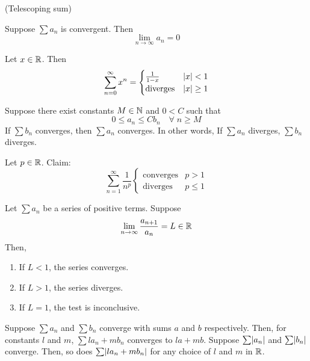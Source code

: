 \documentclass[12pt]{article}
\begin{document}
\begin{rem}
    (Telescoping sum)
\end{rem}

\begin{thm} \label{thm:divergence test}
    Suppose $\sum a_{n}$ is convergent. Then \[
        \lim_{n \to \infty} a_{n} = 0
    \]
\end{thm}

\begin{example}
    Let $x \in \mathbb{R}$. Then \[
        \sum_{n=0}^{\infty} x^{n} = \begin{cases}
            \frac{1}{1-x} & \abs{ x} < 1 \\
            \text{diverges} & \abs{ x} \geq 1
        \end{cases}
    \]
\end{example}

\begin{thm} \label{thm:comparison}
    Suppose there exist constants $M \in \mathbb{N}$ and $0 < C$ such that \[
        0 \leq a_{n} \leq C b_{n} \quad\forall\; n \geq M
    \] If $\sum b_{n}$ converges, then $\sum a_{n}$ converges. In other words, If $\sum a_{n}$ diverges, $\sum b_{n}$ diverges.
\end{thm}

\begin{example}
    Let $p \in \mathbb{R}$. Claim: \[
        \sum_{n=1}^{\infty} \frac{1}{n^{p}}
        \begin{cases}
            \text{converges} & p > 1 \\
            \text{diverges} & p \leq 1
        \end{cases}
    \]
\end{example}

\begin{thm} \label{thm:ratio test}
    Let $\sum a_{n}$ be a series of positive terms. Suppose \[
        \lim_{n \to \infty} \frac{a_{n+1}}{a_{n}} = L \in \mathbb{R}
    \] Then,
    \begin{enumerate}[label=(\alph*)]
        \item If $L < 1$, the series converges.
        \item If $L > 1$, the series diverges.
        \item If $L = 1$, the test is inconclusive.
    \end{enumerate}
\end{thm}

\begin{thm} \label{thm:series limit laws}
    Suppose $\sum a_{n}$ and $\sum b_{n}$ converge with sums $a$ and $b$ respectively. Then, for constants $l$ and $m$, $\sum la_{n} + mb_{n}$ converges to $la + mb$. Suppose $\sum \abs{ a_{n}}$ and $\sum \abs{ b_{n}}$ converge. Then, so does $\sum \abs{ la_{n} + mb_{n} }$ for any choice of $l$ and $m$ in $\mathbb{R}$.
\end{thm}
\end{document}
